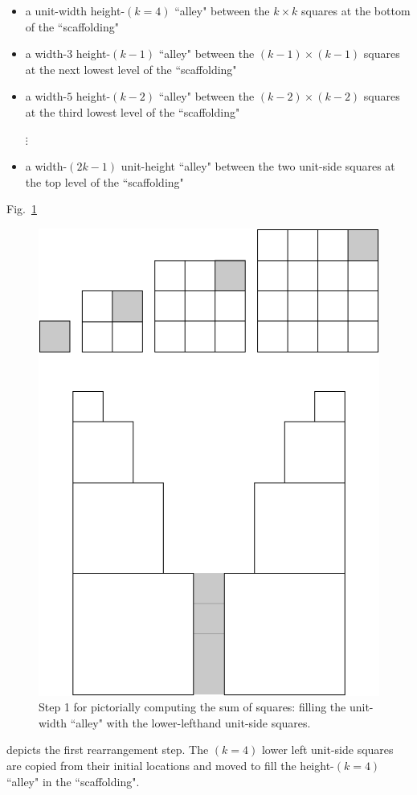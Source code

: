 \begin{itemize}
\item
a unit-width height-$(k=4)$ ``alley" between the $k \times k$ squares at the bottom of the ``scaffolding"
\medskip\item
a width-$3$ height-$(k-1)$ ``alley" between the $(k-1) \times (k-1)$ squares at the next lowest level of the ``scaffolding"
\medskip\item
a width-$5$ height-$(k-2)$ ``alley" between the $(k-2) \times (k-2)$ squares at the third lowest level of the ``scaffolding"

\hspace*{.5in}$\vdots$
\medskip\item
a width-$(2k-1)$ unit-height ``alley" between the two unit-side squares at the top level of the ``scaffolding"
\end{itemize}

\medskip

Fig.~\ref{fig:sumSquares2}
\begin{figure}[htb]
\begin{center}
       \includegraphics[scale=0.3]{FiguresMaths/SumSquares2}
\caption{Step 1 for pictorially computing the sum of squares: filling the unit-width ``alley" with the lower-lefthand unit-side squares.}
       \label{fig:sumSquares2}
\end{center}
\end{figure}
depicts the first rearrangement step.  The $(k=4)$ lower left unit-side squares are copied from their initial locations and moved to fill the height-$(k=4)$ ``alley" in the ``scaffolding".

